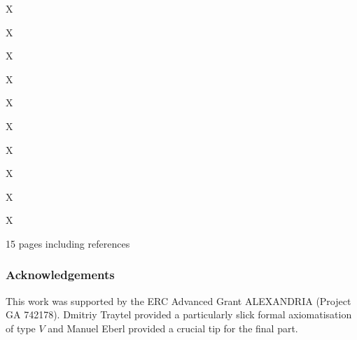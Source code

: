 \documentclass[runningheads]{llncs}
\begin{document}
\begin{isabelle}
X
\end{isabelle}

\begin{isabelle}
X
\end{isabelle}

\begin{isabelle}
X
\end{isabelle}

\begin{isabelle}
X
\end{isabelle}

\begin{isabelle}
X
\end{isabelle}

\begin{isabelle}
X
\end{isabelle}

\begin{isabelle}
X
\end{isabelle}

\begin{isabelle}
X
\end{isabelle}

\begin{isabelle}
X
\end{isabelle}

\begin{isabelle}
X
\end{isabelle}



15 pages including references


\subsubsection{Acknowledgements} 
This work was supported by the ERC Advanced Grant ALEXANDRIA (Project GA 742178). 
Dmitriy Traytel provided a particularly slick formal axiomatisation of type $V$ and Manuel Eberl provided a crucial tip for the final part.



\end{document}
